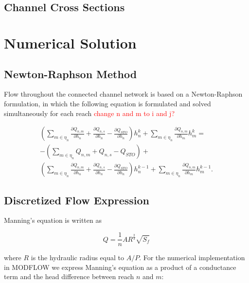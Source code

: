 \documentclass[fleqn]{article}
\begin{document}
\subsection{Channel Cross Sections}

\section{Numerical Solution}

\subsection{Newton-Raphson Method}

Flow throughout the connected channel network is based on a Newton-Raphson formulation, in which the following equation is formulated and solved simultaneously for each reach \textcolor{red}{change n and m to i and j?}

\begin{equation}
\label{eqn:nr-cvfd}
\begin{split}
\left ( \sum\limits_{m \in \eta_{n}} \frac{\partial Q_{n,m}}{\partial h_n} + \frac{\partial Q_{n,s}}{\partial h_n} - \frac{\partial Q_{STO}}{\partial h_n} \right ) h^k_n + 
\sum\limits_{m \in \eta_{n}} \frac{\partial Q_{n,m}}{\partial h_m} h^k_{m} = \\
- \left ( \sum\limits_{m \in \eta_{n}} Q_{n,m} + Q_{n,s} - Q_{STO} \right ) + \\
\left ( \sum\limits_{m \in \eta_{n}} \frac{\partial Q_{n,m}}{\partial h_n} + \frac{\partial Q_{n,s}}{\partial h_n} - \frac{\partial Q_{STO}}{\partial h_n} \right ) h^{k-1}_n + \sum\limits_{m \in \eta_{n}} \frac{\partial Q_{n,m}}{\partial h_m} h^{k-1}_{m}.
\end{split}
\end{equation}

\subsection{Discretized Flow Expression}

Manning's equation is written as

\begin{equation}
  Q = \frac{1}{n} A R^{\frac{2}{3}} \sqrt{S_f}
\end{equation}

\noindent where $R$ is the hydraulic radius equal to $A / P$.  For the numerical implementation in MODFLOW we express Manning's equation as a product of a conductance term and the head difference between reach $n$ and $m$:
\end{document}
